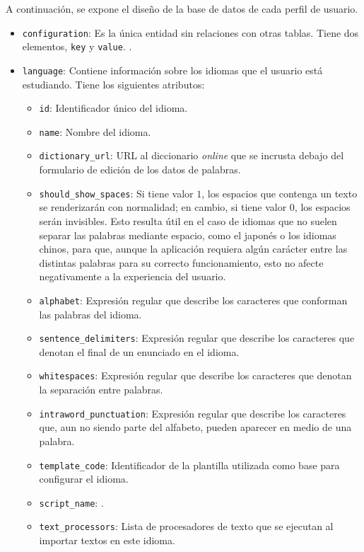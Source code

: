A continuación, se expone el diseño de la base de datos de cada perfil de usuario.

\begin{itemize}
	\item \texttt{configuration}: Es la única entidad sin relaciones con otras tablas. Tiene dos elementos, \texttt{key} y \texttt{value}. .
	\item \texttt{language}: Contiene información sobre los idiomas que el usuario está estudiando. Tiene los siguientes atributos:
		\begin{itemize}[label=$\star$]
			\item \texttt{id}: Identificador único del idioma.
			\item \texttt{name}: Nombre del idioma.
			\item \texttt{dictionary\_url}: URL al diccionario \textit{online} que se incrusta debajo del formulario de edición de los datos de palabras.
			\item \texttt{should\_show\_spaces}: Si tiene valor $1$, los espacios que contenga un texto se renderizarán con normalidad; en cambio, si tiene valor $0$, los espacios serán invisibles. Esto resulta útil en el caso de idiomas que no suelen separar las palabras mediante espacio, como el japonés o los idiomas chinos, para que, aunque la aplicación requiera algún carácter entre las distintas palabras para su correcto funcionamiento, esto no afecte negativamente a la experiencia del usuario.
			\item \texttt{alphabet}: Expresión regular que describe los caracteres que conforman las palabras del idioma.
			\item \texttt{sentence\_delimiters}: Expresión regular que describe los caracteres que denotan el final de un enunciado en el idioma.
			\item \texttt{whitespaces}: Expresión regular que describe los caracteres que denotan la separación entre palabras.
			\item \texttt{intraword\_punctuation}: Expresión regular que describe los caracteres que, aun no siendo parte del alfabeto, pueden aparecer en medio de una palabra.
			\item \texttt{template\_code}: Identificador de la plantilla utilizada como base para configurar el idioma.
			\item \texttt{script\_name}: \todo.
			\item \texttt{text\_processors}: Lista de procesadores de texto que se ejecutan al importar textos en este idioma.

\end{itemize}
\end{itemize}
